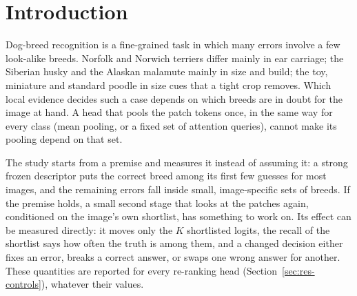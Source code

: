 \documentclass[11pt,a4paper]{article}
\theoremstyle{plain}
\begin{document}
\begin{abstract}
second stage fixes more test images than it breaks (1.91\,\% against 0.68\,\%) and gains most on the most confused
breed pairs (H2), random rivals score no higher than centring (H3), and rival-soft beats class attention over all
classes by $+0.84$ points (H5). The pairwise variant shows no difference (H4, exploratory), and robustness is reported
as exploratory (H7). None of these effects appears on Stanford Dogs. The rival head's test top-1 peaks at a shortlist
of $K=3$ and falls slowly up to $K=10$ while the shortlist's recall rises, which meets the criterion of H6, but every
step lies within the seed spread and the class query falls from $K=2$ on. Across four frozen backbones the rule never separates rival from the class query. ConvNeXt-T gives
the highest accuracy (87.89\,\%), although its labelled ImageNet pre-training included 3,115 of the 5,200 Tsinghua
test images. On 30 held-out breeds the re-rankers detect unknown breeds about as well as the linear probe.
\end{abstract}

\section{Introduction}\label{sec:intro}

Dog-breed recognition is a fine-grained task in which many errors involve a few look-alike breeds. Norfolk and
Norwich terriers differ mainly in ear carriage; the Siberian husky and the Alaskan malamute mainly in size and
build; the toy, miniature and standard poodle in size cues that a tight crop removes. Which local evidence decides such a
case depends on which breeds are in doubt for the image at hand. A head that pools the patch tokens once, in the
same way for every class (mean pooling, or a fixed set of attention queries), cannot make its pooling depend on
that set.

The study starts from a premise and measures it instead of assuming it: a strong frozen descriptor puts the correct
breed among its first few guesses for most images, and the remaining errors fall inside small, image-specific sets
of breeds. If the premise holds, a small second stage that looks at the patches again, conditioned on the image's
own shortlist, has something to work on. Its effect can be measured directly: it moves only the $K$ shortlisted
logits, the recall of the shortlist says how often the truth is among them, and a changed decision either fixes an
error, breaks a correct answer, or swaps one wrong answer for another. These quantities are reported for every
re-ranking head (Section~\ref{sec:res-controls}), whatever their values.
\end{document}
